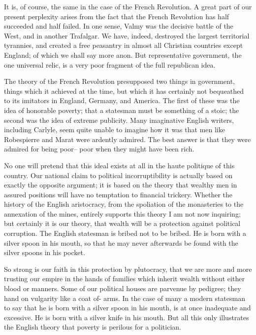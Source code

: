 \documentclass[final,10pt,letterpaper,twocolumn,openany]{book}
\begin{document}
It is, of course, the same in the case of the French Revolution. A great
part of our present perplexity arises from the fact that the French
Revolution has half succeeded and half failed. In one sense, Valmy was
the decisive battle of the West, and in another Trafalgar. We have, indeed,
destroyed the largest territorial tyrannies, and created a free peasantry in
almost all Christian countries except England; of which we shall say more
anon. But representative government, the one universal relic, is a very
poor fragment of the full republican idea. 

The theory of the French
Revolution presupposed two things in government, things which it
achieved at the time, but which it has certainly not bequeathed to its
imitators in England, Germany, and America. The first of these was the
idea of honorable poverty; that a statesman must be something of a stoic;
the second was the idea of extreme publicity. Many imaginative English
writers, including Carlyle, seem quite unable to imagine how it was that
men like Robespierre and Marat were ardently admired. The best answer
is that they were admired for being poor-- poor when they might have
been rich.

No one will pretend that this ideal exists at all in the haute politique of
this country. Our national claim to political incorruptibility is actually
based on exactly the opposite argument; it is based on the theory that
wealthy men in assured positions will have no temptation to financial
trickery. Whether the history of the English aristocracy, from the
spoliation of the monasteries to the annexation of the mines, entirely
supports this theory I am not now inquiring; but certainly it is our theory,
that wealth will be a protection against political corruption. The English
statesman is bribed not to be bribed. He is born with a silver spoon in his
mouth, so that he may never afterwards be found with the silver spoons in
his pocket. 

So strong is our faith in this protection by plutocracy, that we
are more and more trusting our empire in the hands of families which
inherit wealth without either blood or manners. Some of our political
houses are parvenue by pedigree; they hand on vulgarity like a coat of-
arms. In the case of many a modern statesman to say that he is born with a
silver spoon in his mouth, is at once inadequate and excessive. He is born
with a silver knife in his mouth. But all this only illustrates the English
theory that poverty is perilous for a politician.
\end{document}
